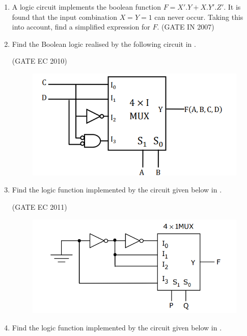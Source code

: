 \begin{enumerate}[label=\arabic*.,ref=\theenumi]
\begin{figure}[H]
\caption{}
\label{fig:2007-gate-ec-43}
\end{figure}
\item 
\label{prob:2007-gate-in-10}
      A logic circuit implements the boolean function $F=X'.Y+X.Y'.Z'$. It is found that the input combination $X=Y=1$ can never occur. Taking this into account, find a simplified expression for $F$. 
\hfill (GATE IN 2007)
\item 
\label{prob:2010-gate-ec-39}
Find the Boolean logic realised by the following circuit in 
.

\hfill (GATE EC 2010)
\begin{figure}[H]
\centering
	\includegraphics[width=0.5\columnwidth]{figs/2010-gate-ec-39.png}
\caption{}
\label{fig:2010-gate-ec-39}
\end{figure}
\item 
\label{prob:2011-gate-ec-20}
Find the logic function implemented by the circuit given below 
in 
.

\hfill (GATE EC 2011)
\begin{figure}[H]
\centering
	\includegraphics[width=0.75\columnwidth]{figs/2011-gate-ec-20.png}
\caption{}
\label{fig:2011-gate-ec-20}
\end{figure}
\item 
\label{prob:2017-gate-ec-16}
Find the logic function implemented by the circuit given below 
in 
.


\end{enumerate}
